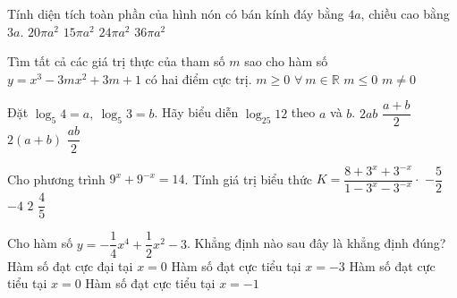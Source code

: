 \begin{ex}%
	Tính diện tích toàn phần của hình nón có bán kính đáy bằng $ 4a $, chiều cao bằng $ 3a $.	
	\choice
	{$ 20 \pi a^2 $}
	{$ 15 \pi a^2 $}
	{$ 24 \pi a^2 $}
	{ \True $ 36 \pi a^2 $}
\end{ex}
\begin{ex}%
	Tìm tất cả các giá trị thực của tham số $ m $ sao cho hàm số $ y = x^3 - 3mx^2 + 3m + 1 $ có hai điểm cực trị.
	\choice
	{$ m \geq 0 $}
	{$ \forall \ m \in \mathbb{R} $}
	{$  m \leq 0 $}
	{ \True $ m \neq 0  $}
\end{ex}
\begin{ex}%
	Đặt $ \log_5 4 = a,\ \log_5 3 = b $. Hãy biểu diễn $ \log_{25} 12  $ theo $ a $ và $ b $.
	\choice
	{$ 2ab $}
	{ \True $ \dfrac{a + b}{2} $}
	{$ 2(a + b) $}
	{$ \dfrac{ab}{2} $}
\end{ex}
\begin{ex}%
	Cho phương trình $ 9^x + 9^{ - x } = 14$. Tính giá trị biểu thức $ K = \dfrac{ 8 + 3^x + 3^{ - x }}{ 1 - 3^x - 3^{ - x }} \cdot $
	\choice
	{$ - \dfrac{5}{2} $}
	{ \True $ -4 $}
	{$ 2 $}
	{$ \dfrac{4}{5} $}
\end{ex}
\begin{ex}%
	Cho hàm số $ y = - \dfrac{1}{4}x^4 + \dfrac{1}{2}x^2 - 3 $. Khẳng định nào sau đây là khẳng định đúng?
	\choice
	{Hàm số đạt cực đại tại $ x = 0 $}
	{Hàm số đạt cực tiểu tại $ x = -3 $}
	{ \True Hàm số đạt cực tiểu tại $ x = 0 $}
	{Hàm số đạt cực tiểu tại $ x = -1 $}
\end{ex}
